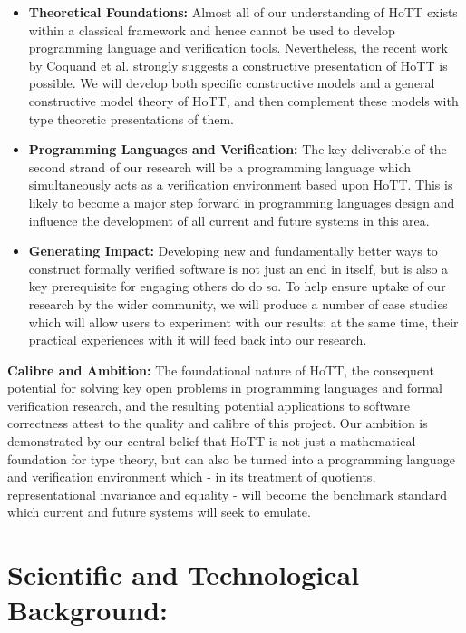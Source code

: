 \documentclass[a4paper,11pt]{article}
\begin{document}
\begin{itemize}
\item {\bf Theoretical Foundations:} Almost all of our understanding
  of HoTT exists within a classical framework and hence cannot be used
  to develop programming language and verification tools. Nevertheless, the recent
  work by Coquand et al. strongly suggests a constructive presentation of HoTT
  is possible. We will develop both specific constructive models
  and a general constructive model theory of HoTT, and then complement
  these models with type theoretic presentations of them.
\item {\bf Programming Languages and Verification:} The key
  deliverable of the second strand of our research will be a
  programming language which simultaneously acts as a verification
  environment based upon HoTT. This is likely to become a major
  step forward in programming languages design and influence
  the development of all current and future systems in this area.
\item {\bf Generating Impact:} Developing new and fundamentally
  better ways to construct formally verified software is not just an
  end in itself, but is also a key prerequisite for engaging others do
  do so.  To help ensure uptake of our research by the wider
  community, we will produce a number of case studies which will allow
  users to experiment with our results; at the same time, their
  practical experiences with it will feed back into our research.
\end{itemize}

{\bf Calibre and Ambition:} The foundational nature of HoTT, the
consequent potential for solving key open problems in programming
languages and formal verification research, and the resulting
potential applications to software correctness attest to the quality
and calibre of this project. Our ambition is demonstrated by our
central belief that HoTT is not just a mathematical foundation for
type theory, but can also be turned into a programming language and
verification environment which - in its treatment of quotients,
representational invariance and equality - will become the benchmark
standard which current and future systems will seek to emulate.


\section{Scientific and Technological Background:}
\end{document}
